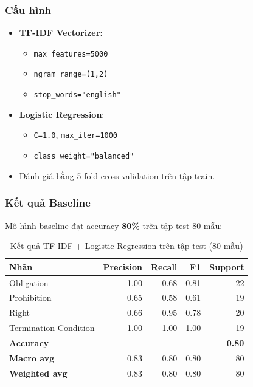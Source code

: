 \subsubsection{Cấu hình}

\begin{itemize}
    \item \textbf{TF-IDF Vectorizer}:
    \begin{itemize}
        \item \texttt{max\_features=5000}
        \item \texttt{ngram\_range=(1,2)}
        \item \texttt{stop\_words="english"}
    \end{itemize}
    \item \textbf{Logistic Regression}:
    \begin{itemize}
        \item \texttt{C=1.0}, \texttt{max\_iter=1000}
        \item \texttt{class\_weight="balanced"}
    \end{itemize}
    \item Đánh giá bằng 5-fold cross-validation trên tập train.
\end{itemize}

\subsubsection{Kết quả Baseline}

Mô hình baseline đạt accuracy \textbf{80\%} trên tập test 80 mẫu:

\begin{table}[H]
    \centering
    \caption{Kết quả TF-IDF + Logistic Regression trên tập test (80 mẫu)}
    \label{tab:tfidf_results}
    \begin{tabular}{|l|r|r|r|r|}
        \hline
        \textbf{Nhãn} & \textbf{Precision} & \textbf{Recall} & \textbf{F1} & \textbf{Support} \\ \hline
        Obligation            & 1.00 & 0.68 & 0.81 & 22 \\ \hline
        Prohibition           & 0.65 & 0.58 & 0.61 & 19 \\ \hline
        Right                 & 0.66 & 0.95 & 0.78 & 20 \\ \hline
        Termination Condition & 1.00 & 1.00 & 1.00 & 19 \\ \hline
        \textbf{Accuracy}     & \multicolumn{3}{r|}{} & \textbf{0.80} \\ \hline
        \textbf{Macro avg}    & 0.83 & 0.80 & 0.80 & 80 \\ \hline
        \textbf{Weighted avg} & 0.83 & 0.80 & 0.80 & 80 \\ \hline
    \end{tabular}
\end{table}


